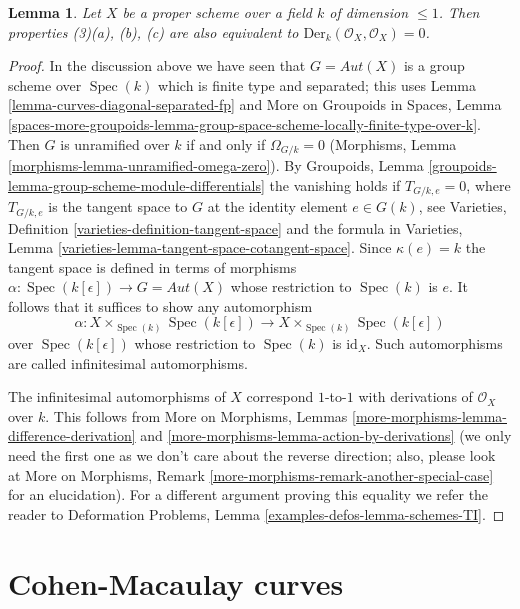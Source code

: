 \documentclass{stacks-project}
\theoremstyle{plain}
\newtheorem{lemma}[subsection]{Lemma}
\theoremstyle{definition}
\theoremstyle{remark}
\numberwithin{equation}{subsection}
\def\Spec{\mathop{\mathrm{Spec}}}
\begin{document}
\begin{lemma}
\label{lemma-in-DM-locus-vector-fields}
Let $X$ be a proper scheme over a field $k$ of dimension $\leq 1$.
Then properties (3)(a), (b), (c) are also equivalent to
$\text{Der}_k(\mathcal{O}_X, \mathcal{O}_X) = 0$.
\end{lemma}

\begin{proof}
In the discussion above we have seen that $G = \mathit{Aut}(X)$
is a group scheme over $\Spec(k)$ which is finite type and separated;
this uses Lemma \ref{lemma-curves-diagonal-separated-fp} and
More on Groupoids in Spaces, Lemma
\ref{spaces-more-groupoids-lemma-group-space-scheme-locally-finite-type-over-k}.
Then $G$ is unramified over $k$ if and only if $\Omega_{G/k} = 0$
(Morphisms, Lemma \ref{morphisms-lemma-unramified-omega-zero}).
By Groupoids, Lemma \ref{groupoids-lemma-group-scheme-module-differentials}
the vanishing holds if $T_{G/k, e} = 0$, where $T_{G/k, e}$ is the tangent
space to $G$ at the identity element $e \in G(k)$, see
Varieties, Definition \ref{varieties-definition-tangent-space}
and the formula in
Varieties, Lemma \ref{varieties-lemma-tangent-space-cotangent-space}.
Since $\kappa(e) = k$ the tangent space is defined in terms of
morphisms $\alpha : \Spec(k[\epsilon]) \to G = \mathit{Aut}(X)$
whose restriction to $\Spec(k)$ is $e$.
It follows that it suffices to show any automorphism
$$
\alpha :
X \times_{\Spec(k)} \Spec(k[\epsilon])
\longrightarrow
X \times_{\Spec(k)} \Spec(k[\epsilon])
$$
over $\Spec(k[\epsilon])$ whose restriction to $\Spec(k)$ is
$\text{id}_X$. Such automorphisms are
called infinitesimal automorphisms.

\medskip\noindent
The infinitesimal automorphisms of $X$ correspond $1$-to-$1$
with derivations of $\mathcal{O}_X$ over $k$. This follows from
More on Morphisms, Lemmas \ref{more-morphisms-lemma-difference-derivation} and
\ref{more-morphisms-lemma-action-by-derivations} (we only need the first one
as we don't care about the reverse direction; also, please look at
More on Morphisms, Remark \ref{more-morphisms-remark-another-special-case}
for an elucidation). For a different argument proving this equality
we refer the reader to
Deformation Problems, Lemma \ref{examples-defos-lemma-schemes-TI}.
\end{proof}





\section{Cohen-Macaulay curves}
\label{section-CM}
\end{document}
